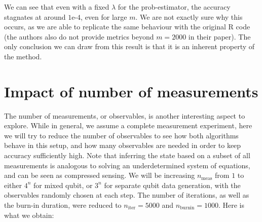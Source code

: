 \documentclass[12pt]{memoir}
\newcommand{\nitern}[1]{$n_{\text{iter}}=#1$}
\newcommand{\nburninn}[1]{$n_{\text{burnin}}=#1$}
\newcommand{\nmeas}[0]{$n_{\text{meas}} $ }
\begin{document}
We can see that even with a fixed $\lambda$ for the prob-estimator, the accuracy stagnates at around $1\text{e-}4$, even for large $m$. We are not exactly sure why this occurs, as we are able to replicate the same behaviour with the original R code (the authors also do not provide metrics beyond $m=2000$ in their paper). The only conclusion we can draw from this result is that it is an inherent property of the method.


\section{Impact of number of measurements}\label{section:comp-nb-meas}

The number of measurements, or observables, is another interesting aspect to explore. While in general, we assume a complete measurement experiment, here we will try to reduce the number of observables to see how both algorithms behave in this setup, and how many observables are needed in order to keep accuracy sufficiently high. Note that inferring the state based on a subset of all measurements is analogous to solving an underdetermined system of equations, and can be seen as compressed sensing. We will be increasing \nmeas from $1$ to either $4^n$ for mixed qubit, or $3^n$ for separate qubit data generation, with the observables randomly chosen at each step. The number of iterations, as well as the burn-in duration, were reduced to \nitern{5000} and \nburninn{1000}. Here is what we obtain:
\end{document}
